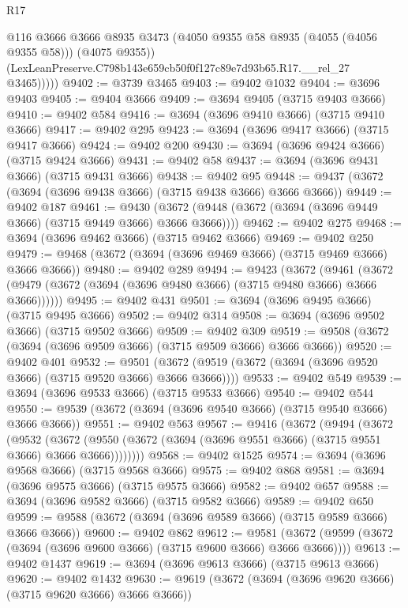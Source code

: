 \begin{lexlean}{R17}
\begin{coremodule}
              @116
              @3666
              @3666
              @8935
              @3473
              (@4050 @9355 @58 @8935 (@4055 (@4056 @9355 @58)))
              (@4075 @9355))
            (LexLeanPreserve.C798b143e659cb50f0f127c89e7d93b65.R17.__rel_27 @3465)))))
@9402 := @3739 @3465
@9403 := @9402 @1032
@9404 := @3696 @9403
@9405 := @9404 @3666
@9409 := @3694 @9405 (@3715 @9403 @3666)
@9410 := @9402 @584
@9416 := @3694 (@3696 @9410 @3666) (@3715 @9410 @3666)
@9417 := @9402 @295
@9423 := @3694 (@3696 @9417 @3666) (@3715 @9417 @3666)
@9424 := @9402 @200
@9430 := @3694 (@3696 @9424 @3666) (@3715 @9424 @3666)
@9431 := @9402 @58
@9437 := @3694 (@3696 @9431 @3666) (@3715 @9431 @3666)
@9438 := @9402 @95
@9448 := @9437 (@3672 (@3694 (@3696 @9438 @3666) (@3715 @9438 @3666) @3666 @3666))
@9449 := @9402 @187
@9461 := @9430 (@3672 (@9448 (@3672 (@3694 (@3696 @9449 @3666) (@3715 @9449 @3666) @3666 @3666))))
@9462 := @9402 @275
@9468 := @3694 (@3696 @9462 @3666) (@3715 @9462 @3666)
@9469 := @9402 @250
@9479 := @9468 (@3672 (@3694 (@3696 @9469 @3666) (@3715 @9469 @3666) @3666 @3666))
@9480 := @9402 @289
@9494 := @9423
    (@3672
      (@9461 (@3672 (@9479 (@3672 (@3694 (@3696 @9480 @3666) (@3715 @9480 @3666) @3666 @3666))))))
@9495 := @9402 @431
@9501 := @3694 (@3696 @9495 @3666) (@3715 @9495 @3666)
@9502 := @9402 @314
@9508 := @3694 (@3696 @9502 @3666) (@3715 @9502 @3666)
@9509 := @9402 @309
@9519 := @9508 (@3672 (@3694 (@3696 @9509 @3666) (@3715 @9509 @3666) @3666 @3666))
@9520 := @9402 @401
@9532 := @9501 (@3672 (@9519 (@3672 (@3694 (@3696 @9520 @3666) (@3715 @9520 @3666) @3666 @3666))))
@9533 := @9402 @549
@9539 := @3694 (@3696 @9533 @3666) (@3715 @9533 @3666)
@9540 := @9402 @544
@9550 := @9539 (@3672 (@3694 (@3696 @9540 @3666) (@3715 @9540 @3666) @3666 @3666))
@9551 := @9402 @563
@9567 := @9416
    (@3672
      (@9494
        (@3672
          (@9532
            (@3672 (@9550 (@3672 (@3694 (@3696 @9551 @3666) (@3715 @9551 @3666) @3666 @3666))))))))
@9568 := @9402 @1525
@9574 := @3694 (@3696 @9568 @3666) (@3715 @9568 @3666)
@9575 := @9402 @868
@9581 := @3694 (@3696 @9575 @3666) (@3715 @9575 @3666)
@9582 := @9402 @657
@9588 := @3694 (@3696 @9582 @3666) (@3715 @9582 @3666)
@9589 := @9402 @650
@9599 := @9588 (@3672 (@3694 (@3696 @9589 @3666) (@3715 @9589 @3666) @3666 @3666))
@9600 := @9402 @862
@9612 := @9581 (@3672 (@9599 (@3672 (@3694 (@3696 @9600 @3666) (@3715 @9600 @3666) @3666 @3666))))
@9613 := @9402 @1437
@9619 := @3694 (@3696 @9613 @3666) (@3715 @9613 @3666)
@9620 := @9402 @1432
@9630 := @9619 (@3672 (@3694 (@3696 @9620 @3666) (@3715 @9620 @3666) @3666 @3666))

\end{coremodule}
\end{lexlean}
